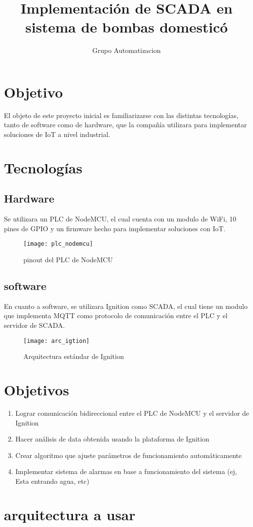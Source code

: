 \documentclass[12pt]{article}
\title{Implementación de SCADA en sistema de bombas domesticó}
\author{Grupo Automatizacion}
\begin{document}
	
	\maketitle
	
	\section{Objetivo}
	
	El objeto de este proyecto inicial es familiarizarse con las distintas tecnologías, tanto de software como de hardware, que la compañía utilizara para implementar soluciones de IoT a nivel industrial.
	
	\section{Tecnologías}
	
	\subsection{Hardware}
	Se utilizara un PLC de NodeMCU, el cual cuenta con un modulo de WiFi, 10 pines de GPIO y un firmware hecho para implementar soluciones con IoT.
	
	\begin{figure}[h]
		\centering
		\caption{pinout del PLC de NodeMCU}
		\texttt{[image: plc\_nodemcu]}
	\end{figure}
	
	\subsection{software}
	En cuanto a software, se utilizara Ignition como SCADA, el cual tiene un modulo que implementa MQTT como protocolo de comunicación entre el PLC y el servidor de SCADA.
	
	
	\begin{figure}[h]
		\centering
		\caption{Arquitectura estándar de Ignition}
		\texttt{[image: arc\_igtion]}
	\end{figure}
	
	\section{Objetivos}
	
	\begin{enumerate}
		\item Lograr comunicación bidireccional entre el PLC de NodeMCU y el servidor de Ignition
		\item Hacer análisis de data obtenida usando la plataforma de Ignition
		\item Crear algoritmo que ajuste parámetros de funcionamiento automáticamente
		\item Implementar sistema de alarmas en base a funcionamiento del sistema (ej, Esta entrando agua, etc)
	\end{enumerate}
	
	\section{arquitectura a usar}
	
	
\end{document}
